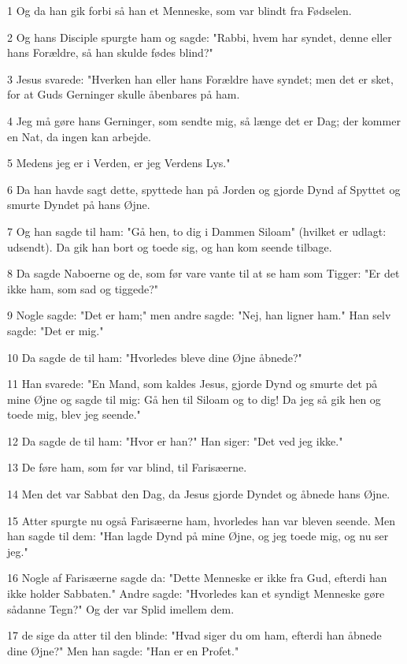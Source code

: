 \par 1 Og da han gik forbi så han et Menneske, som var blindt fra Fødselen.
\par 2 Og hans Disciple spurgte ham og sagde: "Rabbi, hvem har syndet, denne eller hans Forældre, så han skulde fødes blind?"
\par 3 Jesus svarede: "Hverken han eller hans Forældre have syndet; men det er sket, for at Guds Gerninger skulle åbenbares på ham.
\par 4 Jeg må gøre hans Gerninger, som sendte mig, så længe det er Dag; der kommer en Nat, da ingen kan arbejde.
\par 5 Medens jeg er i Verden, er jeg Verdens Lys."
\par 6 Da han havde sagt dette, spyttede han på Jorden og gjorde Dynd af Spyttet og smurte Dyndet på hans Øjne.
\par 7 Og han sagde til ham: "Gå hen, to dig i Dammen Siloam" (hvilket er udlagt: udsendt). Da gik han bort og toede sig, og han kom seende tilbage.
\par 8 Da sagde Naboerne og de, som før vare vante til at se ham som Tigger: "Er det ikke ham, som sad og tiggede?"
\par 9 Nogle sagde: "Det er ham;" men andre sagde: "Nej, han ligner ham." Han selv sagde: "Det er mig."
\par 10 Da sagde de til ham: "Hvorledes bleve dine Øjne åbnede?"
\par 11 Han svarede: "En Mand, som kaldes Jesus, gjorde Dynd og smurte det på mine Øjne og sagde til mig: Gå hen til Siloam og to dig! Da jeg så gik hen og toede mig, blev jeg seende."
\par 12 Da sagde de til ham: "Hvor er han?" Han siger: "Det ved jeg ikke."
\par 13 De føre ham, som før var blind, til Farisæerne.
\par 14 Men det var Sabbat den Dag, da Jesus gjorde Dyndet og åbnede hans Øjne.
\par 15 Atter spurgte nu også Farisæerne ham, hvorledes han var bleven seende. Men han sagde til dem: "Han lagde Dynd på mine Øjne, og jeg toede mig, og nu ser jeg."
\par 16 Nogle af Farisæerne sagde da: "Dette Menneske er ikke fra Gud, efterdi han ikke holder Sabbaten." Andre sagde: "Hvorledes kan et syndigt Menneske gøre sådanne Tegn?" Og der var Splid imellem dem.
\par 17 de sige da atter til den blinde: "Hvad siger du om ham, efterdi han åbnede dine Øjne?" Men han sagde: "Han er en Profet."
